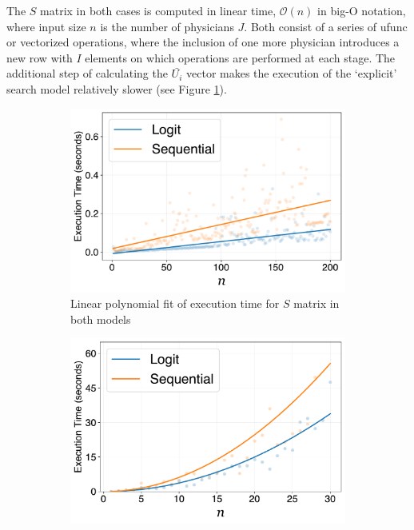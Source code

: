 \documentclass[../main.tex]{subfiles}
\begin{document}
The $S$ matrix in both cases is computed in linear time, $\mathcal{O}(n)$ in big-O notation, where input size $n$ is the number of physicians $J$. Both consist of a series of ufunc or vectorized operations, where the inclusion of one more physician introduces a new row with $I$ elements on which operations are performed at each stage. The additional step of calculating the $\bar{U_i}$ vector makes the execution of the `explicit' search model relatively slower (see Figure \ref{fig:subfig1}).

\begin{figure}[H]
    \centering
    \begin{subfigure}[b]{0.45\linewidth}
        \centering
        \includegraphics[width=\linewidth]{linear.pdf}
        \vspace{-0.6cm}
        \caption{Linear polynomial fit of execution time for $S$ matrix in both models}
        \label{fig:subfig1}
    \end{subfigure}
    \hspace{0.05\linewidth}  %
    \begin{subfigure}[b]{0.45\linewidth}
        \centering
        \includegraphics[width=\linewidth]{squared.pdf}

\end{subfigure}
\end{figure}
\end{document}
